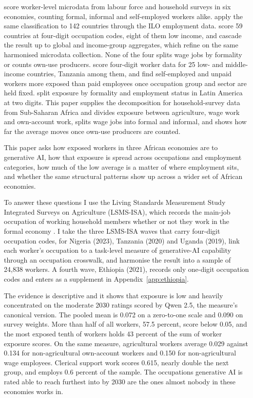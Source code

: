 \citet{pizzinelli2023} score
worker-level microdata from labour force and household surveys in six
economies, counting formal, informal and self-employed workers alike.
\citet{cazzaniga2024} apply the same classification to 142 countries through the
ILO employment data. \citet{gmyrek2023} score 59 countries at four-digit
occupation codes, eight of them low income, and cascade the result up to global
and income-group aggregates, which \citet{gmyrek2025} refine on the same
harmonised microdata collection. None of the four splits wage jobs by
formality or counts own-use producers. \citet{demombynes2025} 
score four-digit worker data for 25 low- and middle-income countries,
Tanzania among them, and find self-employed and unpaid workers more exposed
than paid employees once occupation group and sector are held fixed.
\citet{gmyrek2024lac} split exposure by formality and employment status in
Latin America at two digits. This paper supplies the decomposition for
household-survey data from Sub-Saharan Africa and divides exposure between
agriculture, wage work and own-account work, splits wage jobs into formal and
informal, and shows how far the average moves once own-use producers are
counted.

This paper asks how exposed workers in three African economies are to generative
AI, how that exposure is spread across occupations and employment categories,
how much of the low average is a matter of where employment sits, and whether
the same structural patterns show up across a wider set of African economies.

To answer these questions I use the Living Standards Measurement Study
Integrated Surveys on Agriculture (LSMS-ISA), which records the main-job
occupation of working household members whether or not they work in the formal
economy \citep{lsmsisa}. I take the three LSMS-ISA waves that carry four-digit
occupation codes, for Nigeria (2023), Tanzania (2020) and Uganda (2019), link
each worker's occupation to a task-level measure of generative-AI capability
through an occupation crosswalk, and harmonise the result into a sample of
24,838 workers. A fourth wave, Ethiopia (2021), records only one-digit
occupation codes and enters as a supplement in Appendix~\ref{app:ethiopia}.

The evidence is descriptive and it shows that exposure is low and heavily 
concentrated on the
moderate 2030 ratings scored by Qwen 2.5, the measure's canonical version. The
pooled mean is 0.072 on a zero-to-one scale and 0.090 on survey weights. More
than half of all workers, 57.5 percent, score below 0.05, and the most exposed
tenth of workers holds 43 percent of the sum of worker exposure scores.
On the same measure, agricultural workers average 0.029 against 0.134 for
non-agricultural own-account workers and 0.150 for non-agricultural wage
employees. Clerical support work scores 0.615, nearly double the next group, 
and employs 0.6 percent of
the sample. The occupations generative AI is rated able to reach furthest into
by 2030 are the ones almost nobody in these economies works in.

